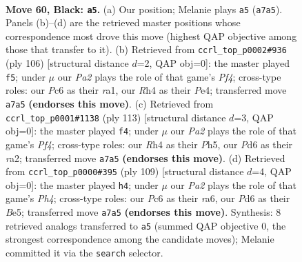 \documentclass[11pt]{article}
\begin{document}
\clearpage

\begin{figure}[p]\centering
\begin{subfigure}{0.46\textwidth}\centering
\resizebox{\linewidth}{!}{%
\newchessgame
\chessboard[
  setfen={8/p7/2pp4/5k2/7r/8/5K2/8 b - - 1 60},
  showmover=false,
  pgfstyle=straightmove, color=movearrow, markmove={a7-a5}
]}
\caption{}
\end{subfigure}\hfill
\begin{subfigure}{0.46\textwidth}\centering
\resizebox{\linewidth}{!}{%
\newchessgame
\chessboard[
  setfen={8/8/6K1/8/2k1PP1P/8/8/r7 w - - 3 54},
  showmover=false,
  pgfstyle=straightmove, color=movearrow, markmove={f4-f5}
]}
\caption{}
\end{subfigure}
\\[4pt]
\begin{subfigure}{0.46\textwidth}\centering
\resizebox{\linewidth}{!}{%
\newchessgame
\chessboard[
  setfen={8/8/8/5ppp/8/6k1/R7/4K3 b - - 3 57},
  showmover=false,
  pgfstyle=straightmove, color=movearrow, markmove={f5-f4}
]}
\caption{}
\end{subfigure}\hfill
\begin{subfigure}{0.46\textwidth}\centering
\resizebox{\linewidth}{!}{%
\newchessgame
\chessboard[
  setfen={8/8/R7/4b1pp/8/5k2/8/3K4 b - - 3 55},
  showmover=false,
  pgfstyle=straightmove, color=movearrow, markmove={h5-h4}
]}
\caption{}
\end{subfigure}
\caption{\textbf{Move 60, Black: \texttt{a5}.} (a) Our position; Melanie plays \texttt{a5} (\texttt{a7a5}). Panels (b)--(d) are the retrieved master positions whose correspondence most drove this move (highest QAP objective among those that transfer to it). (b) Retrieved from \texttt{ccrl\_top\_p0002\#936} (ply 106) [structural distance $d$=2, QAP obj=0]: the master played \texttt{f5}; under $\mu$ our \emph{Pa2} plays the role of that game's \emph{Pf4}; cross-type roles: our \emph{P}c6 as their \emph{r}a1, our \emph{R}h4 as their \emph{P}e4; transferred move \texttt{a7a5} \textbf{(endorses this move)}. (c) Retrieved from \texttt{ccrl\_top\_p0001\#1138} (ply 113) [structural distance $d$=3, QAP obj=0]: the master played \texttt{f4}; under $\mu$ our \emph{Pa2} plays the role of that game's \emph{Pf4}; cross-type roles: our \emph{R}h4 as their \emph{P}h5, our \emph{P}d6 as their \emph{r}a2; transferred move \texttt{a7a5} \textbf{(endorses this move)}. (d) Retrieved from \texttt{ccrl\_top\_p0000\#395} (ply 109) [structural distance $d$=4, QAP obj=0]: the master played \texttt{h4}; under $\mu$ our \emph{Pa2} plays the role of that game's \emph{Ph4}; cross-type roles: our \emph{P}c6 as their \emph{r}a6, our \emph{P}d6 as their \emph{B}e5; transferred move \texttt{a7a5} \textbf{(endorses this move)}. Synthesis: 8 retrieved analogs transferred to \texttt{a5} (summed QAP objective 0, the strongest correspondence among the candidate moves); Melanie committed it via the \texttt{search} selector.}
\label{fig:thought-m119}
\end{figure}
\end{document}
